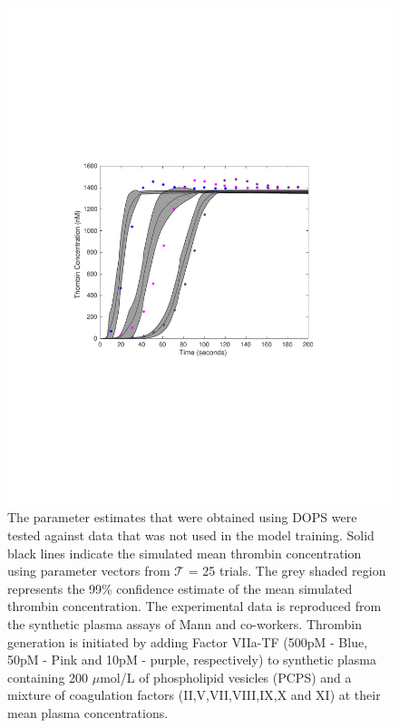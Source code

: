 \documentclass{bmcart}
\begin{document}
\begin{backmatter}
\begin{figure}[h!]
\centering
\includegraphics[trim = {3cm 6cm 3cm 6cm }, clip,width=1.0\textwidth]{./rachelfigs/ReplicateFigure6DivBySqrtN.pdf}
\caption{ The parameter estimates that were obtained using DOPS were tested against data that was not used in the model training. Solid black lines indicate the simulated mean thrombin concentration using parameter vectors from $\mathcal{T}$ = 25 trials. The grey shaded region represents the 99\% confidence estimate of the mean simulated thrombin concentration. The experimental data is reproduced from the synthetic plasma assays of Mann and co-workers. Thrombin generation is initiated by adding Factor VIIa-TF (500pM - Blue, 50pM - Pink and 10pM - purple, respectively) to synthetic plasma containing 200 $\mu$mol/L of phospholipid vesicles (PCPS) and a mixture of coagulation factors (II,V,VII,VIII,IX,X and XI) at their mean plasma concentrations.
}\label{fig-validation}
\end{figure}


\end{backmatter}
\end{document}
